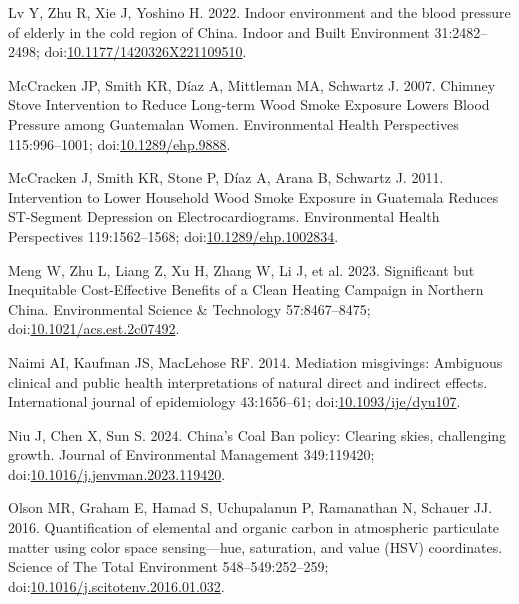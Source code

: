 \documentclass[
  letterpaper,
  DIV=11,
  numbers=noendperiod]{scrartcl}
\newlength{\cslhangindent}
\newlength{\cslentryspacingunit} %
\newenvironment{CSLReferences}[2] %
 {%
  \setlength{\parindent}{0pt}
  \ifodd #1
  \let\oldpar\par
  \def\par{\hangindent=\cslhangindent\oldpar}
  \fi
  \setlength{\parskip}{#2\cslentryspacingunit}
 }%
 {}
\begin{document}
\begin{CSLReferences}{1}{0}
\leavevmode{}%
Lv Y, Zhu R, Xie J, Yoshino H. 2022. Indoor environment and the blood
pressure of elderly in the cold region of {China}. Indoor and Built
Environment 31:2482--2498;
doi:\href{https://doi.org/10.1177/1420326X221109510}{10.1177/1420326X221109510}.

\leavevmode{}%
McCracken JP, Smith KR, Díaz A, Mittleman MA, Schwartz J. 2007. Chimney
{Stove Intervention} to {Reduce Long-term Wood Smoke Exposure Lowers
Blood Pressure} among {Guatemalan Women}. Environmental Health
Perspectives 115:996--1001;
doi:\href{https://doi.org/10.1289/ehp.9888}{10.1289/ehp.9888}.

\leavevmode{}%
McCracken J, Smith KR, Stone P, Díaz A, Arana B, Schwartz J. 2011.
Intervention to {Lower Household Wood Smoke Exposure} in {Guatemala
Reduces ST-Segment Depression} on {Electrocardiograms}. Environmental
Health Perspectives 119:1562--1568;
doi:\href{https://doi.org/10.1289/ehp.1002834}{10.1289/ehp.1002834}.

\leavevmode{}%
Meng W, Zhu L, Liang Z, Xu H, Zhang W, Li J, et al. 2023. Significant
but {Inequitable Cost-Effective Benefits} of a {Clean Heating Campaign}
in {Northern China}. Environmental Science \& Technology 57:8467--8475;
doi:\href{https://doi.org/10.1021/acs.est.2c07492}{10.1021/acs.est.2c07492}.

\leavevmode{}%
Naimi AI, Kaufman JS, MacLehose RF. 2014. Mediation misgivings:
Ambiguous clinical and public health interpretations of natural direct
and indirect effects. International journal of epidemiology 43:1656--61;
doi:\href{https://doi.org/10.1093/ije/dyu107}{10.1093/ije/dyu107}.

\leavevmode{}%
Niu J, Chen X, Sun S. 2024. China's {Coal Ban} policy: {Clearing} skies,
challenging growth. Journal of Environmental Management 349:119420;
doi:\href{https://doi.org/10.1016/j.jenvman.2023.119420}{10.1016/j.jenvman.2023.119420}.

\leavevmode{}%
Olson MR, Graham E, Hamad S, Uchupalanun P, Ramanathan N, Schauer JJ.
2016. Quantification of elemental and organic carbon in atmospheric
particulate matter using color space sensing---hue, saturation, and
value ({HSV}) coordinates. Science of The Total Environment
548--549:252--259;
doi:\href{https://doi.org/10.1016/j.scitotenv.2016.01.032}{10.1016/j.scitotenv.2016.01.032}.


\end{CSLReferences}
\end{document}
